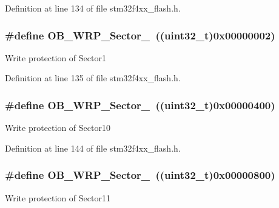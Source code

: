 Definition at line 134 of file stm32f4xx\-\_\-flash.\-h.

\hypertarget{group___option___bytes___write___protection_gac9644173d5d7d5f67f5b623fcfb3b40f}{
\subsubsection[{O\-B\-\_\-\-W\-R\-P\-\_\-\-Sector\-\_\-1}]{\setlength{\rightskip}{0pt plus 5cm}\#define O\-B\-\_\-\-W\-R\-P\-\_\-\-Sector\-\_~((uint32\-\_\-t)0x00000002)}}\label{group___option___bytes___write___protection_gac9644173d5d7d5f67f5b623fcfb3b40f}
Write protection of Sector1 

Definition at line 135 of file stm32f4xx\-\_\-flash.\-h.

\hypertarget{group___option___bytes___write___protection_ga886ff84dee003a1fbb6de64bf9465455}{
\subsubsection[{O\-B\-\_\-\-W\-R\-P\-\_\-\-Sector\-\_\-10}]{\setlength{\rightskip}{0pt plus 5cm}\#define O\-B\-\_\-\-W\-R\-P\-\_\-\-Sector\-\_~((uint32\-\_\-t)0x00000400)}}\label{group___option___bytes___write___protection_ga886ff84dee003a1fbb6de64bf9465455}
Write protection of Sector10 

Definition at line 144 of file stm32f4xx\-\_\-flash.\-h.

\hypertarget{group___option___bytes___write___protection_gadd07be676785c86096ad546f2e792d17}{
\subsubsection[{O\-B\-\_\-\-W\-R\-P\-\_\-\-Sector\-\_\-11}]{\setlength{\rightskip}{0pt plus 5cm}\#define O\-B\-\_\-\-W\-R\-P\-\_\-\-Sector\-\_~((uint32\-\_\-t)0x00000800)}}\label{group___option___bytes___write___protection_gadd07be676785c86096ad546f2e792d17}
Write protection of Sector11 


